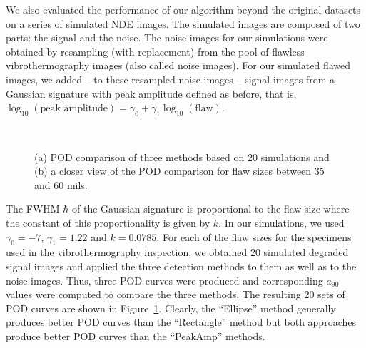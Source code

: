 \documentclass[12pt]{article}
\begin{document}
We also evaluated the performance of our algorithm beyond the original
datasets on a series of simulated NDE images. The simulated images are
composed of two parts: the signal and the noise. The noise images for our
simulations were obtained by resampling (with replacement) from the
pool of flawless vibrothermography images (also called noise
images). For our simulated 
flawed images, we added -- to these resampled noise images -- signal
images from a Gaussian signature  with  peak amplitude defined as
before, that is, $\log_{10} (\mbox{peak amplitude})=\gamma _{0}
+\gamma _{1}  \log_{10} (\mbox{flaw})$.
\begin{figure}[h]
\begin{center}
\mbox{
}
\end{center}
\vspace{-0.2in}
\caption{(a) POD comparison of three methods based on 20
  simulations and (b) a closer view of the POD comparison for flaw
  sizes between 35 and 60 mils.}
\label{f1213}
\vspace{-0,1in}
\end{figure}
The FWHM $\hbar$ of the 
Gaussian signature is proportional to the flaw size %
where the constant of this proportionality is given by $k$. In our
simulations, we used $\gamma _{0} =-7$, $\gamma _{1} =1.22$ and
$k=0.0785$. For each of the flaw sizes for the specimens used in the
vibrothermography inspection, we obtained 20 simulated degraded signal images
and applied the three detection  methods to them as well as to the
noise images. Thus, three POD curves were produced and corresponding
$a_{90} $ values were computed to compare the three methods. 
The resulting 20 sets of POD curves are shown in
Figure~\ref{f1213}. Clearly, the ``Ellipse'' method  generally
produces better POD curves than the ``Rectangle'' method 
but both approaches produce better POD curves than the
``PeakAmp'' methods.
\end{document}
